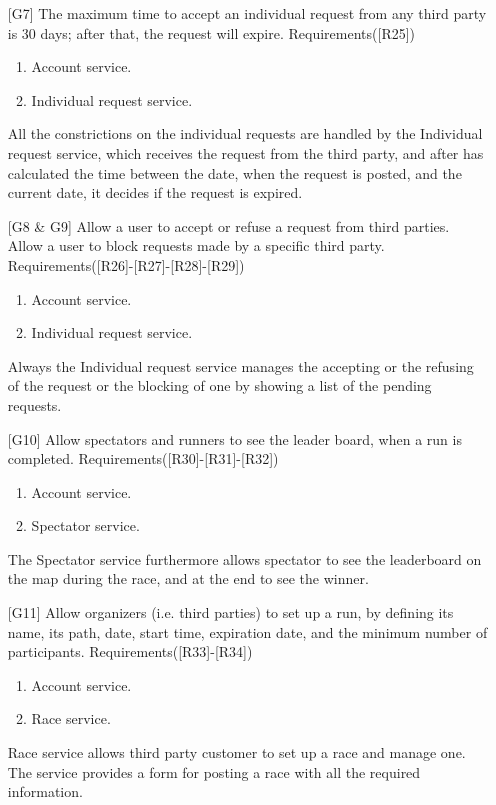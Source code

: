 \begin{itemize}
\item[{[G7]}] The maximum time to accept an individual request from any third party is 30 days; after that, the request will expire. Requirements([R25])
	\begin{enumerate}
	\item Account service.
	\item Individual request service.
	\end{enumerate}
All the constrictions on the individual requests are handled by the Individual request service, which receives the request from the third party, and after has  calculated the time between the date, when the request is posted, and the current date, it decides if the request is expired.

\item[{[G8 \& G9]}] Allow a user to accept or refuse a request from third parties. Allow a user to block requests made by a specific third party. Requirements([R26]-[R27]-[R28]-[R29])
	\begin{enumerate}
	\item Account service.
	\item Individual request service.
	\end{enumerate}
Always the Individual request service manages the accepting or the refusing of the request or the blocking of one by showing a list of the pending requests. 	
	
\item[{[G10]}] Allow spectators and runners to see the leader board, when a run is completed. Requirements([R30]-[R31]-[R32])
	\begin{enumerate}
	\item Account service.
	\item Spectator service.
	\end{enumerate}
The Spectator service furthermore allows spectator to see the leaderboard on the map during the race, and at the end to see the winner. 
	
\item[{[G11]}] Allow organizers (i.e. third parties) to set up a run, by defining its name, its path, date, start time, expiration date, and the minimum number of participants. Requirements([R33]-[R34])
	\begin{enumerate}
	\item Account service.
	\item Race service.
	\end{enumerate}
Race service allows third party customer to set up a race and manage one. The service provides a form for posting a race with all the required information.
	

\end{itemize}
